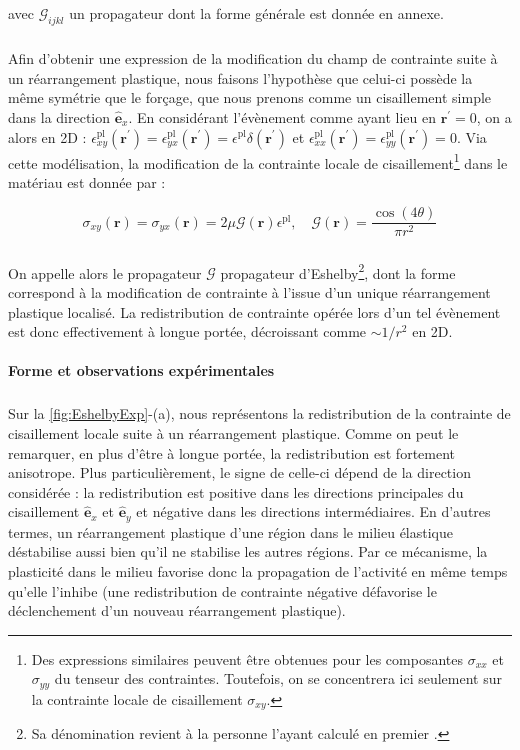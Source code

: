 \noindent avec $\mathcal{G}_{ijkl}$ un propagateur dont la forme générale est donnée en annexe.

\subparagraph{}Afin d'obtenir une expression de la modification du champ de contrainte suite à un réarrangement plastique, nous faisons l'hypothèse que celui-ci possède la même symétrie que le forçage, que nous prenons comme un cisaillement simple dans la direction $\hat{\mathbf{e}}_x$. En considérant l'évènement comme ayant lieu en $\mathbf{r}^\prime = 0$, on a alors en 2D : $\epsilon_{xy}^\text{pl}(\mathbf{r}^\prime) = \epsilon_{yx}^\text{pl}(\mathbf{r}^\prime) = \epsilon^\text{pl}\delta(\mathbf{r}^\prime)$ et $\epsilon_{xx}^\text{pl}(\mathbf{r}^\prime) = \epsilon_{yy}^\text{pl}(\mathbf{r}^\prime) = 0$. Via cette modélisation, la modification de la contrainte locale de cisaillement\footnote{Des expressions similaires peuvent être obtenues pour les composantes $\sigma_{xx}$ et $\sigma_{yy}$ du tenseur des contraintes. Toutefois, on se concentrera ici seulement sur la contrainte locale de cisaillement $\sigma_{xy}$.} dans le matériau est donnée par :

\begin{equation}
	\sigma_{xy}(\mathbf{r})= \sigma_{yx}(\mathbf{r}) = 2\mu \mathcal{G}(\mathbf{r}) \epsilon^\text{pl}, \quad \mathcal{G}(\mathbf{r}) = \frac{\cos (4\theta)}{\pi r^2}
	\label{eq:Eshelby}
\end{equation}

\subparagraph{}On appelle alors le propagateur $\mathcal{G}$ propagateur d'Eshelby\footnote{Sa dénomination revient à la personne l'ayant calculé en premier \cite{eshelby_determination_1997}.}, dont la forme correspond à la modification de contrainte à l'issue d'un unique réarrangement plastique localisé. La redistribution de contrainte opérée lors d'un tel évènement est donc effectivement à longue portée, décroissant comme $\sim 1/r^2$ en 2D.

\paragraph{Forme et observations expérimentales}

\subparagraph{}Sur la \autoref{fig:EshelbyExp}-(a), nous représentons la redistribution de la contrainte de cisaillement locale suite à un réarrangement plastique. Comme on peut le remarquer, en plus d'être à longue portée, la redistribution est fortement anisotrope. Plus particulièrement, le signe de celle-ci dépend de la direction considérée : la redistribution est positive dans les directions principales du cisaillement $\hat{\mathbf{e}}_x$ et $\hat{\mathbf{e}}_y$ et négative dans les directions intermédiaires. En d'autres termes, un réarrangement plastique d'une région dans le milieu élastique déstabilise aussi bien qu'il ne stabilise les autres régions. Par ce mécanisme, la plasticité dans le milieu favorise donc la propagation de l'activité en même temps qu'elle l'inhibe (une redistribution de contrainte négative défavorise le déclenchement d'un nouveau réarrangement plastique).


